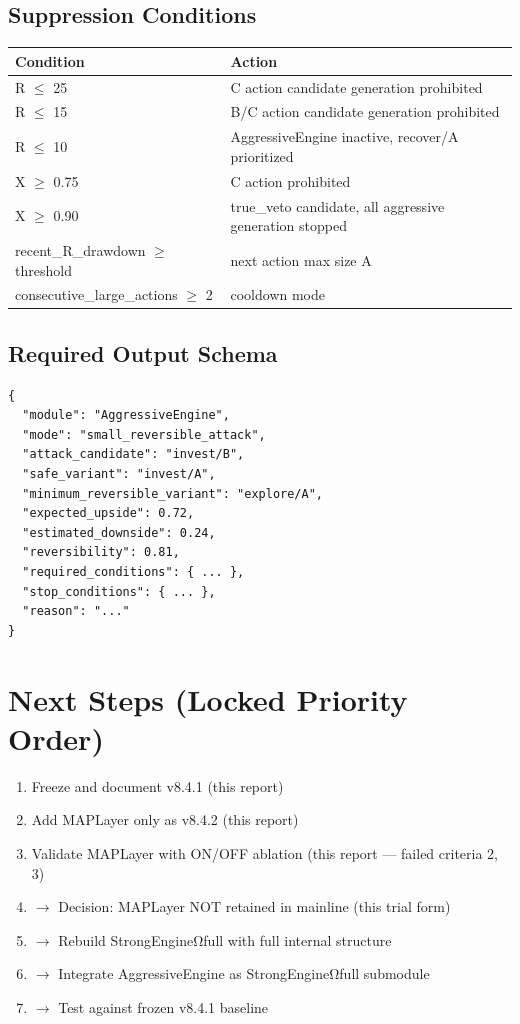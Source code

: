 \documentclass[11pt,a4paper]{article}
\begin{document}
\subsection{Suppression Conditions}

\begin{tabular}{lp{8cm}}
\toprule
\textbf{Condition} & \textbf{Action} \\
\midrule
R $\leq$ 25 & C action candidate generation prohibited \\
R $\leq$ 15 & B/C action candidate generation prohibited \\
R $\leq$ 10 & AggressiveEngine inactive, recover/A prioritized \\
X $\geq$ 0.75 & C action prohibited \\
X $\geq$ 0.90 & true\_veto candidate, all aggressive generation stopped \\
recent\_R\_drawdown $\geq$ threshold & next action max size A \\
consecutive\_large\_actions $\geq$ 2 & cooldown mode \\
\bottomrule
\end{tabular}

\subsection{Required Output Schema}

\begin{verbatim}
{
  "module": "AggressiveEngine",
  "mode": "small_reversible_attack",
  "attack_candidate": "invest/B",
  "safe_variant": "invest/A",
  "minimum_reversible_variant": "explore/A",
  "expected_upside": 0.72,
  "estimated_downside": 0.24,
  "reversibility": 0.81,
  "required_conditions": { ... },
  "stop_conditions": { ... },
  "reason": "..."
}
\end{verbatim}

\section{Next Steps (Locked Priority Order)}

\begin{enumerate}
  \item[1.] \checkmark Freeze and document v8.4.1 (this report)
  \item[2.] \checkmark Add MAPLayer only as v8.4.2 (this report)
  \item[3.] \checkmark Validate MAPLayer with ON/OFF ablation (this report — failed criteria 2, 3)
  \item[4.] $\rightarrow$ Decision: MAPLayer NOT retained in mainline (this trial form)
  \item[5.] $\rightarrow$ Rebuild StrongEngineΩfull with full internal structure
  \item[6.] $\rightarrow$ Integrate AggressiveEngine as StrongEngineΩfull submodule
  \item[7.] $\rightarrow$ Test against frozen v8.4.1 baseline
\end{enumerate}
\end{document}
